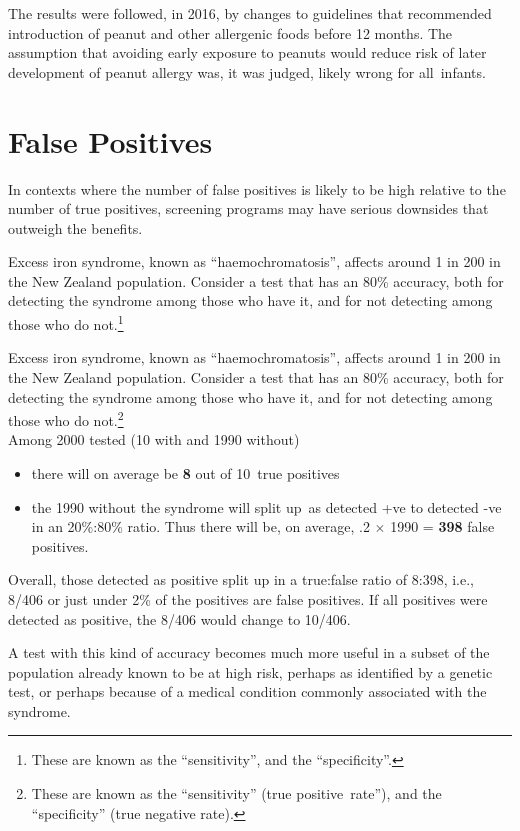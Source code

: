 \documentclass[
  10pt,
  b5paper]{book}
\providecommand{\tightlist}{%
  \setlength{\itemsep}{0pt}\setlength{\parskip}{0pt}}
\begin{document}
The results were followed, in 2016, by changes to guidelines that
recommended introduction of peanut and other allergenic foods before 12
months. The assumption that avoiding early exposure to peanuts would
reduce risk of later development of peanut allergy was, it was judged,
likely wrong for all~infants.

\hypertarget{false-positives}{%
\section{False Positives}\label{false-positives}}

In contexts where the number of false positives is likely to be high
relative to the number of true positives, screening programs may have
serious downsides that outweigh the benefits.

Excess iron syndrome, known as ``haemochromatosis'', affects around 1 in
200 in the New Zealand population. Consider a test that has an 80\%
accuracy, both for detecting the syndrome among those who have it, and
for not detecting among those who do not.\footnote{These are known as the ``sensitivity'', and the
  ``specificity''.}

Excess iron syndrome, known as ``haemochromatosis'', affects around 1 in
200 in the New Zealand population. Consider a test that has an 80\%
accuracy, both for detecting the syndrome among those who have it, and
for not detecting among those who do not.\footnote{These are known as the ``sensitivity'' (true
  positive~rate''), and the ``specificity'' (true negative rate).}\\
Among 2000 tested (10 with and 1990 without)

\begin{itemize}
\tightlist
\item
  there will on average be \textbf{8} out of 10~true positives
\item
  the 1990 without the syndrome will split up~as detected +ve to
  detected -ve in an 20\%:80\% ratio. Thus there will be, on average, .2
  \(\times\) 1990 = \textbf{398} false positives.
\end{itemize}

Overall, those detected as positive split up in a true:false ratio of
8:398, i.e., 8/406 or just under 2\% of the positives are false
positives. If all positives were detected as positive, the 8/406 would
change to 10/406.

A test with this kind of accuracy becomes much more useful in a subset
of the population already known to be at high risk, perhaps as
identified by a genetic test, or perhaps because of a medical condition
commonly associated with the syndrome.
\end{document}
